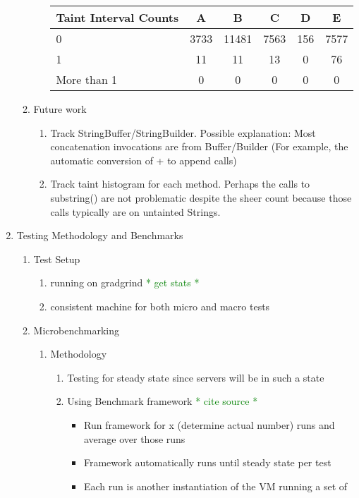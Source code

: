 \documentclass[times,11pt]{article}
\begin{document}
\begin{enumerate}
\begin{enumerate}
\begin{enumerate}
				\begin{tabular}{l|ccccc} 
				\hline
					\textbf{Taint Interval Counts} & \textbf{A} & \textbf{B} & \textbf{C} & \textbf{D} & \textbf{E} \\ 
				\hline
					0	& 3733	& 11481	& 7563	& 156	& 7577 \\
					1	& 11	& 11	& 13	& 0	& 76 \\
					More than 1	& 0	& 0	& 0	& 0	& 0 \\
				\hline
				\end{tabular}
			\end{enumerate}
		\item Future work
			\begin{enumerate}
			\item Track StringBuffer/StringBuilder. Possible explanation: Most concatenation invocations are from Buffer/Builder (For example, the automatic conversion of + to append calls)
			\item Track taint histogram for each method. Perhaps the calls to substring() are not problematic despite the sheer count because those calls typically are on untainted Strings.
			\end{enumerate}
		\end{enumerate}
	\item Testing Methodology and Benchmarks
		\begin{enumerate}
		\item Test Setup
			\begin{enumerate}
			\item running on gradgrind \textcolor{green}{* get stats *}
			\item consistent machine for both micro and macro tests
			\end{enumerate}
		\item Microbenchmarking
			\begin{enumerate}
			\item Methodology
				\begin{enumerate}
				\item Testing for steady state since servers will be in such a 
					state
				\item Using Benchmark framework \textcolor{green}{* cite source *}
					\begin{itemize}
					\item Run framework for x (determine actual number) runs and average 
						over those runs
					\item Framework automatically runs until steady state per test
					\item Each run is another instantiation of the VM running a set of 

\end{itemize}
\end{enumerate}
\end{enumerate}
\end{enumerate}
\end{enumerate}
\end{document}
